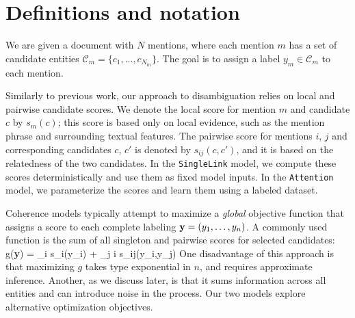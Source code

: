 

\section{Definitions and notation}

We are given a document with $N$ mentions, where each mention $m$ has a set of candidate entities $\mathcal{C}_m = \{c_1, ..., c_{N_m}\}$. The goal is to assign a label $y_m \in \mathcal{C}_m$ to each mention.

Similarly to previous work, our approach to disambiguation relies on local and pairwise candidate scores. We denote the local score for mention $m$ and candidate $c$ by $s_m(c)$; this score is based only on local evidence, such as the mention phrase and surrounding textual features. The pairwise score for mentions $i$, $j$ and corresponding candidates $c$, $c'$ is denoted by $s_{ij}(c, c')$,  and it is based on the relatedness of the two candidates. In the \texttt{SingleLink} model, we compute these scores deterministically and use them as fixed model inputs. In the \texttt{Attention} model, we parameterize the scores and learn them using a labeled dataset.

Coherence models typically attempt to maximize a {\em global} objective function that assigns a score to each complete labeling ${\bf y} = (y_1,\ldots, y_n)$.  A commonly used function is the sum of all singleton and pairwise scores for selected candidates:
\be
g({\bf y}) = \sum_i s_i(y_i) + \sum_{j \neq i} s_{ij}(y_i,y_j)
\label{eq:global_obj}
\ee 
One disadvantage of this approach is that maximizing $g$ takes type exponential in $n$, and requires approximate inference. Another, as we discuss later, is that it sums information across all entities and can introduce noise in the process. Our two models explore alternative optimization objectives.

